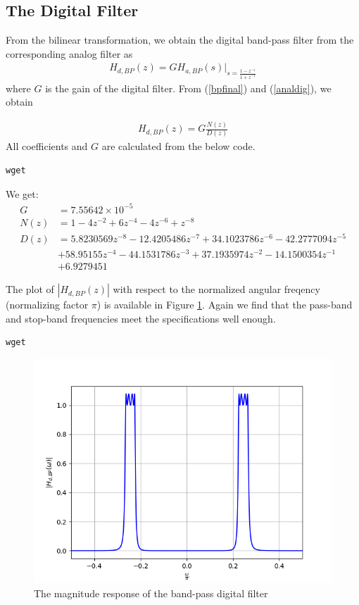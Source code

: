\documentclass{article}
\begin{document}
\subsection{The Digital Filter}
From the bilinear transformation, we obtain the digital band-pass filter from the corresponding analog filter as
\begin{eqnarray}
\label{analdig}
H_{d,BP}(z) = GH_{a,BP}(s)\vert_{s = \frac{1-z^{-1}}{1 + z^{-1}}}
\end{eqnarray}
where $G$ is the gain of the digital filter.  From (\ref{bpfinal}) and (\ref{analdig}), we obtain

\begin{eqnarray}
H_{d,BP}(z) = G \frac{N(z)}{D(z)}
\end{eqnarray}
All coefficients and $G$ are calculated from the below code.
\begin{lstlisting}[caption = {Code for G, N(z), D(z)}]
wget 
\end{lstlisting}

We get:
\begin{align}
    G &= 7.55642 \times 10^{-5}\\
    N(z) &=  1 - 4 z^{-2} + 6 z^{-4} - 4z^{-6} + z^{-8}\\
    D(z) &= 5.8230569z^{-8} - 12.4205486z^{-7} + 34.1023786z^{-6} - 42.2777094z^{-5}\nonumber \\
  &+ 58.95155z^{-4} - 44.1531786z^{-3} + 37.1935974z^{-2} - 14.1500354z^{-1}\nonumber\\
  &+ 6.9279451
\end{align}

The plot of $|H_{d,BP}(z)|$ with respect to the normalized angular freqency (normalizing factor $\pi$) is available in Figure \ref{fig:5}.  Again we
find that the pass-band and stop-band frequencies meet the specifications well enough.
\begin{lstlisting}[caption = {Code for Figure 5}]
wget 
\end{lstlisting}
\begin{figure}[!h]
    \centering
    \includegraphics[width = \columnwidth]{figs/H_dbp.png}
    \caption{The magnitude response of the band-pass digital filter}
    \label{fig:5}
\end{figure}
\end{document}
